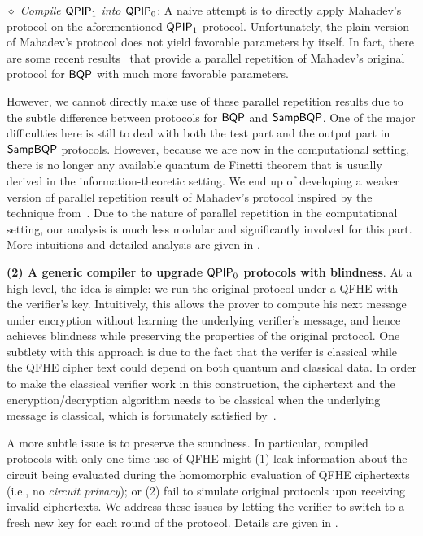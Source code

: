 \vspace{2mm} \noindent  \emph{$\diamond$ Compile $\operatorname{\mathsf{QPIP}}_1$ into $\operatorname{\mathsf{QPIP}}_0$}: 
A naive attempt is to directly apply Mahadev's protocol on the aforementioned $\operatorname{\mathsf{QPIP}}_1$ protocol. 
Unfortunately, the plain version of Mahadev's protocol does not yield favorable parameters by itself. 
In fact, there are some recent results~\cite{arXiv:AlaChiHun19, arXiv:ChiaChungYam19} that provide a parallel repetition of Mahadev's original protocol for $\operatorname{\mathsf{BQP}}$ with 
much more favorable parameters. 

However, we cannot directly make use of these parallel repetition results due to the subtle difference between protocols for $\operatorname{\mathsf{BQP}}$ and $\operatorname{\mathsf{SampBQP}}$. 
One of the major difficulties here is still to deal with both the test part and the output part in $\operatorname{\mathsf{SampBQP}}$ protocols. 
However, because we are now in the computational setting, there is no longer any available quantum de Finetti theorem that is usually derived in the information-theoretic setting. 
We end up of developing a weaker version of parallel repetition result of Mahadev's protocol inspired by the technique from~\cite{arXiv:ChiaChungYam19}. 
Due to the nature of parallel repetition in the computational setting, our analysis is much less modular and significantly involved for this part.  
More intuitions and detailed analysis are given in .

\vspace{2mm} \noindent \textbf{(2) A generic compiler to upgrade $\operatorname{\mathsf{QPIP}}_0$ protocols with blindness}. At a high-level, the idea is simple: we run the original protocol under a QFHE with the verifier's key. Intuitively, this allows the prover to compute his next message under encryption without learning the underlying verifier's message, and hence achieves blindness while preserving the properties of the original protocol. 
One subtlety with this approach is due to the fact that the verifer is classical while the QFHE cipher text could depend on both quantum and classical data. 
In order to make the classical verifier work in this construction, the ciphertext and the encryption/decryption algorithm needs to be classical when the underlying message is classical, which is fortunately satisfied by~\cite{mahadev_qfhe}. 

A more subtle issue is to preserve the soundness. 
In particular, compiled protocols with only one-time use of QFHE might (1) leak information about the circuit being evaluated during the homomorphic evaluation of QFHE ciphertexts (i.e., no \emph{circuit privacy}); 
or (2) fail to simulate original protocols upon receiving invalid ciphertexts. 
We address these issues by letting the verifier to switch to a fresh new key for each round of the protocol. 
Details are given in .

